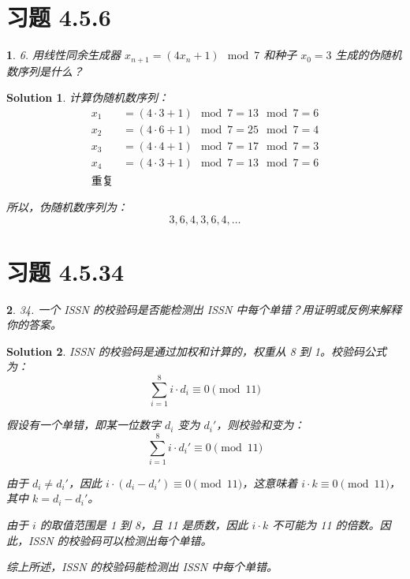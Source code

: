 \documentclass[UTF8]{report}
\newtheorem{solution}{Solution}
\theoremstyle{MyLineTheoremStyle} %
\theoremstyle{MyBlockTheoremStyle} %
\theoremstyle{MySubsubsectionStyle} %
\newtheorem{definition}{}
\begin{document}
\section{习题 4.5.6}

\begin{definition}
    6. 用线性同余生成器 \( x_{n+1} = (4x_n + 1) \mod 7 \) 和种子 \( x_0 = 3 \) 生成的伪随机数序列是什么？
\end{definition}

\begin{solution}
    计算伪随机数序列：
    \[
    \begin{aligned}
        x_1 &= (4 \cdot 3 + 1) \mod 7 = 13 \mod 7 = 6 \\
        x_2 &= (4 \cdot 6 + 1) \mod 7 = 25 \mod 7 = 4 \\
        x_3 &= (4 \cdot 4 + 1) \mod 7 = 17 \mod 7 = 3 \\
        x_4 &= (4 \cdot 3 + 1) \mod 7 = 13 \mod 7 = 6 \\
        \text{重复}
    \end{aligned}
    \]

    所以，伪随机数序列为：
    \[
    3, 6, 4, 3, 6, 4, \ldots
    \]
\end{solution}

\section{习题 4.5.34}

\begin{definition}
    34. 一个 ISSN 的校验码是否能检测出 ISSN 中每个单错？用证明或反例来解释你的答案。
\end{definition}

\begin{solution}
    ISSN 的校验码是通过加权和计算的，权重从 8 到 1。校验码公式为：
    \[
    \sum_{i=1}^{8} i \cdot d_i \equiv 0 \pmod{11}
    \]

    假设有一个单错，即某一位数字 \( d_i \) 变为 \( d_i' \)，则校验和变为：
    \[
    \sum_{i=1}^{8} i \cdot d_i' \equiv 0 \pmod{11}
    \]

    由于 \( d_i \neq d_i' \)，因此 \( i \cdot (d_i - d_i') \equiv 0 \pmod{11} \)，这意味着 \( i \cdot k \equiv 0 \pmod{11} \)，其中 \( k = d_i - d_i' \)。

    由于 \( i \) 的取值范围是 1 到 8，且 11 是质数，因此 \( i \cdot k \) 不可能为 11 的倍数。因此，ISSN 的校验码可以检测出每个单错。

    综上所述，ISSN 的校验码能检测出 ISSN 中每个单错。
\end{solution}
\end{document}

